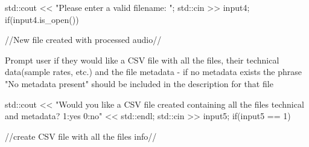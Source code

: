 \begin{DoxyVerb}
    std::cout << "Please enter a valid filename: ";
    std::cin >> input4;
    if(input4.is_open()){

        //New file created with processed audio//

    }

Prompt user if they would like a CSV file with all the files, their technical data(sample rates, etc.) and the file metadata 
    - if no metadata exists the phrase "No metadata present" should be included in the description for that file

    std::cout << "Would you like a CSV file created containing all the files technical and metadata? 1:yes 0:no" << std::endl;
    std::cin >> input5;
    if(input5 == 1){

        //create CSV file with all the files info//

    }
\end{DoxyVerb}
 